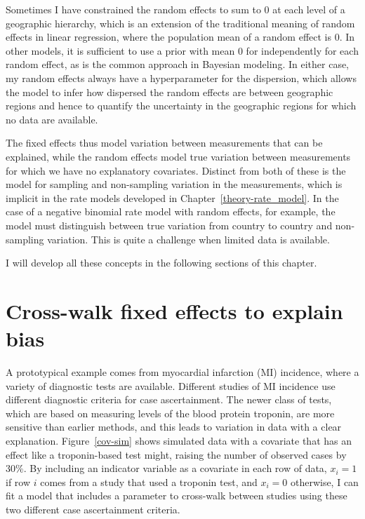 Sometimes I have constrained the random effects to sum to $0$ at each
level of a geographic hierarchy, which is an extension of the
traditional meaning of random effects in linear regression, where the
population mean of a random effect is $0$.  In other models, it is
sufficient to use a prior with mean $0$ for independently for each random effect, as is
the common approach in Bayesian modeling.  In either case, my random
effects always have a hyperparameter for the dispersion, which allows
the model to infer how dispersed the random effects are between
geographic regions and hence to quantify the uncertainty in the
geographic regions for which no data are available.

The fixed effects thus model variation between measurements that can
be explained, while the random effects model true variation between
measurements for which we have no explanatory covariates.  Distinct
from both of these is the model for sampling and non-sampling
variation in the measurements, which is implicit in the rate models
developed in Chapter~\ref{theory-rate_model}.  In the case of a
negative binomial rate model with random effects, for example, the model must
distinguish between true variation from country to country and
non-sampling variation.  This is quite a challenge when limited data
is available.

I will develop all these concepts in the following
sections of this chapter.

\section{Cross-walk fixed effects to explain bias}

A prototypical example comes from myocardial infarction (MI)
incidence, where a variety of diagnostic tests are available.
Different studies of MI incidence use different diagnostic criteria
for case ascertainment.  The newer class of tests, which are based on
measuring levels of the blood protein troponin, are more sensitive
than earlier methods, and this leads to variation in data with a clear
explanation.  Figure~\ref{cov-sim} shows simulated data with a
covariate that has an effect like a troponin-based test might, raising
the number of observed cases by $30\%$. By including an indicator
variable as a covariate in each row of data, $x_i = 1$ if row $i$
comes from a study that used a troponin test, and $x_i = 0$ otherwise,
I can fit a model that includes a parameter to cross-walk between
studies using these two different case ascertainment criteria.

